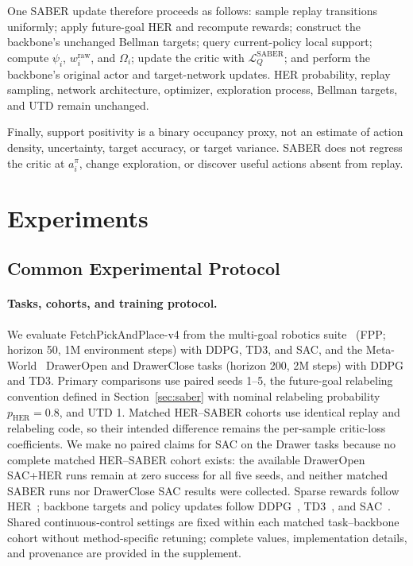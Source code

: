 \documentclass[letterpaper]{article}
\begin{document}
One SABER update therefore proceeds as follows: sample replay
transitions uniformly; apply future-goal HER and recompute rewards;
construct the backbone's unchanged Bellman targets; query
current-policy local support; compute \(\psi_i\), \(w_i^{\mathrm{raw}}\),
and \(\Omega_i\); update the critic with
\(\mathcal L_Q^{\mathrm{SABER}}\); and perform the backbone's original
actor and target-network updates.  HER probability, replay sampling,
network architecture, optimizer, exploration process, Bellman
targets, and UTD remain unchanged.

Finally, support positivity is a binary occupancy proxy, not an
estimate of action density, uncertainty, target accuracy, or target
variance. SABER does not regress the critic at \(a_i^\pi\), change
exploration, or discover useful actions absent from replay.

\section{Experiments}\label{sec:experiments}

\subsection{Common Experimental Protocol}

\paragraph{Tasks, cohorts, and training protocol.}
We evaluate FetchPickAndPlace-v4 from the multi-goal robotics suite~\citep{plappert2018multigoal} (FPP; horizon 50, 1M environment steps) with DDPG, TD3, and SAC, and the Meta-World~\citep{yu2020metaworld} DrawerOpen and DrawerClose tasks (horizon 200, 2M steps) with DDPG and TD3. Primary comparisons use paired seeds 1--5, the future-goal relabeling convention defined in Section~\ref{sec:saber} with nominal relabeling probability \(p_{\mathrm{HER}}=0.8\), and UTD 1. Matched HER--SABER cohorts use identical replay and relabeling code, so their intended difference remains the per-sample critic-loss coefficients. We make no paired claims for SAC on the Drawer tasks because no complete matched HER--SABER cohort exists: the available DrawerOpen SAC+HER runs remain at zero success for all five seeds, and neither matched SABER runs nor DrawerClose SAC results were collected. Sparse rewards follow HER~\citep{andrychowicz2017her}; backbone targets and policy updates follow DDPG~\citep{lillicrap2016ddpg}, TD3~\citep{fujimoto2018td3}, and SAC~\citep{haarnoja2018sac}. Shared continuous-control settings are fixed within each matched task--backbone cohort without method-specific retuning; complete values, implementation details, and provenance are provided in the supplement.
\end{document}
